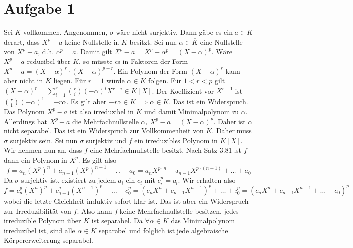 \documentclass{article}
\begin{document}
\def\headheight{25pt}
    \section*{Aufgabe 1}
    Sei $K$ vollkommen. Angenommen, $\sigma$ wäre nicht surjektiv. Dann gäbe es ein $a\in K$ derart, dass $X^p - a$ keine Nullstelle in $K$ besitzt. 
    Sei nun $\alpha \in \overline{K}$ eine Nullstelle von $X^p-a$, d.h. $\alpha^p = a$. Damit gilt $X^p - a = X^p - \alpha^p = (X- \alpha)^p$.
    Wäre $X^p - a$ reduzibel über $K$, so müsste es in Faktoren der Form $X^p - a = (X-\alpha)^r \cdot (X-\alpha)^{p-r}$. Ein Polynom der Form $(X - \alpha)^r$ kann aber nicht in $K$ liegen.
    Für $r = 1$ würde $\alpha \in K$ folgen.
    Für $1 < r < p$ gilt $(X - \alpha)^r = \sum_{i = 1}^{r} \binom{r}{i} (-\alpha)^iX^{r-i} \in K[X]$. Der Koeffizient vor $X^{r-1}$ ist $\binom{r}{1}(-\alpha)^1 = -r \alpha$.
    Es gilt aber $-r \alpha \in K \implies \alpha \in K$. Das ist ein Widerspruch.
    Das Polynom $X^p - a$ ist also irreduzibel in $K$ und damit Minimalpolynom zu $\alpha$.
    Allerdings hat $X^p - a$ die Mehrfachnullstelle $\alpha$, $X^p - a = (X - \alpha)^p$. Daher ist $\alpha$ nicht separabel. 
    Das ist ein Widerspruch zur Vollkommenheit von $K$. Daher muss $\sigma$ surjektiv sein.
    Sei nun $\sigma$ surjektiv und $f$ ein irreduzibles Polynom in $K[X]$.
    Wir nehmen nun an, dass $f$ eine Mehrfachnullstelle besitzt. Nach Satz 3.81 ist $f$ dann ein Polynom in $X^p$. Es gilt also
    \[
        f = a_n (X^p)^n + a_{n-1}(X^p)^{n-1} + \dots + a_0 = a_n X^{p \cdot n} + a_{n-1} X^{p \cdot (n-1)} + \dots + a_0
    \]
    Da $\sigma$ surjektiv ist, existiert zu jedem $a_i$ ein $c_i$ mit $c_i^p = a_i$. Wir erhalten also
    \[
        f = c_n^p (X^n)^p + c_{n-1}^p (X^{n-1})^p + \dots + c_0^p = (c_n X^n + c_{n-1}X^{n-1})^p + \dots + c_0^p = (c_n X^n + c_{n-1}X^{n-1} + \dots + c_0)^p
    \]
    wobei die letzte Gleichheit induktiv sofort klar ist.
    Das ist aber ein Widerspruch zur Irreduzibilität von $f$. Also kann $f$ keine Mehrfachnullstelle besitzen, jedes irreduzible Polynom über $K$ ist separabel.
    Da $\forall \alpha \in \overline K$ das Minimalpolynom irreduzibel ist, sind alle $\alpha \in \overline{K}$ separabel und folglich ist jede algebraische Körpererweiterung separabel.
\end{document}
